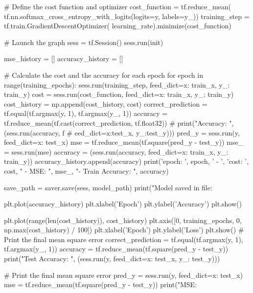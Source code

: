 \documentclass[11pt]{article}
\begin{document}
\begin{python}
# Define the cost function and optimizer
cost_function = tf.reduce_mean(
    tf.nn.softmax_cross_entropy_with_logits(logits=y,
                                            labels=y_))
training_step = tf.train.GradientDescentOptimizer(
    learning_rate).minimize(cost_function)

# Launch the graph
sess = tf.Session()
sess.run(init)

mse_history = []
accuracy_history = []

# Calculate the cost and the accuracy for each epoch
for epoch in range(training_epochs):
    sess.run(training_step, feed_dict={x: train_x, y_: train_y})
    cost = sess.run(cost_function, feed_dict={x: train_x, y_: train_y})
    cost_history = np.append(cost_history, cost)
    correct_prediction = tf.equal(tf.argmax(y, 1), tf.argmax(y_, 1))
    accuracy = tf.reduce_mean(tf.cast(correct_prediction, tf.float32))
    #     print("Accuracy: ", (sess.run(accuracy, f
    #     eed_dict={x:test_x, y_:test_y})))
    pred_y = sess.run(y, feed_dict={x: test_x})
    mse = tf.reduce_mean(tf.square(pred_y - test_y))
    mse_ = sess.run(mse)
    accuracy = (sess.run(accuracy, feed_dict={x: train_x, y_: train_y}))
    accuracy_history.append(accuracy)
    print('epoch: ', epoch, ' - ', 'cost: ', cost, " - MSE: ",
          mse_, "- Train Accuracy: ", accuracy)

save_path = saver.save(sess, model_path)
print("Model saved in file: %

plt.plot(accuracy_history)
plt.xlabel('Epoch')
plt.ylabel('Accuracy')
plt.show()

plt.plot(range(len(cost_history)), cost_history)
plt.axis([0, training_epochs, 0, np.max(cost_history) / 100])
plt.xlabel('Epoch')
plt.ylabel('Loss')
plt.show()
# Print the final mean square error
correct_prediction = tf.equal(tf.argmax(y, 1), tf.argmax(y_, 1))
accuracy = tf.reduce_mean(tf.square(pred_y - test_y))
print("Test Accuracy: ", (sess.run(y, feed_dict={x: test_x, y_: test_y})))

# Print the final mean square error
pred_y = sess.run(y, feed_dict={x: test_x})
mse = tf.reduce_mean(tf.square(pred_y - test_y))
print("MSE: %
\end{python}
\end{document}
